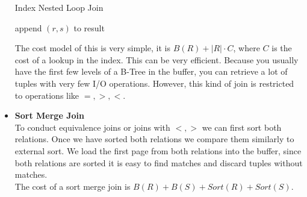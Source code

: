 \begin{itemize}
\begin{algorithm}[H]
\caption{Index Nested Loop Join}
\begin{algorithmic}
		\State append $(r, s)$ to result
	\EndFor
\EndFor
\end{algorithmic}
\end{algorithm} 
The cost model of this is very simple, it is $B(R) + |R| \cdot C$, where $C$ is the cost of a lookup in the index. This can be very efficient. Because you usually have the first few levels of a B-Tree in the buffer, you can retrieve a lot of tuples with very few I/O operations. 
However, this kind of join is restricted to operations like $=, >, <$.
\item \textbf{Sort Merge Join}\\
To conduct equivalence joins or joins with $<, >$ we can first sort both relations. Once we have sorted both relations we compare them similarly to external sort. We load the first page from both relations into the buffer, since both relations are sorted it is easy to find matches and discard tuples without matches.\\
The cost of a sort merge join is $B(R) + B(S) + Sort(R) + Sort(S)$.


\end{itemize}
